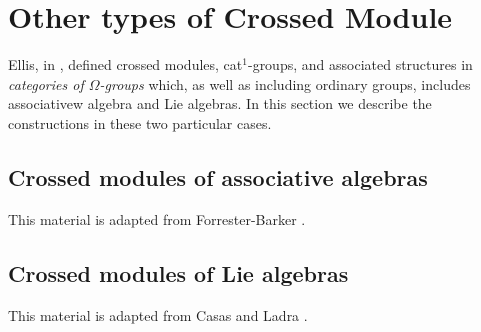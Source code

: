 
\section{Other types of Crossed Module}

Ellis, in \cite{ellis-thesis}, defined crossed modules, cat$^1$-groups, 
and associated structures in \emph{categories of $\Omega$-groups} which, 
as well as including ordinary groups, includes associativew algebra 
and Lie algebras. 
In this section we describe the constructions in these two particular cases. 


\subsection{Crossed modules of associative algebras}

This material is adapted from Forrester-Barker \cite{f-b-thesis}.









\subsection{Crossed modules of Lie algebras}

This material is adapted from Casas and Ladra \cite{casas:ladra}.


